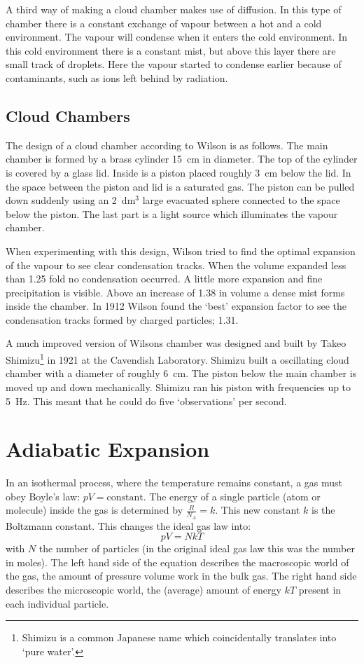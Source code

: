 \documentclass[12pt,a4paper]{article}
\numberwithin{equation}{section}
\numberwithin{figure}{section}
\numberwithin{table}{section}
\begin{document}
A third way of making a cloud chamber makes use of diffusion. In this type of chamber there is a constant exchange of vapour between a hot and a cold environment. The vapour will condense when it enters the cold environment. In this cold environment there is a constant mist, but above this layer there are small track of droplets. Here the vapour started to condense earlier because of contaminants, such as ions left behind by radiation.

\subsection{Cloud Chambers}
The design of a cloud chamber according to Wilson is as follows. The main chamber is formed by a brass cylinder 15~cm in diameter. The top of the cylinder is covered by a glass lid. Inside is a piston placed roughly 3~cm below the lid. In the space between the piston and lid is a saturated gas. The piston can be pulled down suddenly using an 2~dm$^3$ large evacuated sphere connected to the space below the piston. The last part is a light source which illuminates the vapour chamber.

When experimenting with this design, Wilson tried to find the optimal expansion of the vapour to see clear condensation tracks. When the volume expanded less than 1.25 fold no condensation occurred. A little more expansion and fine precipitation is visible. Above an increase of 1.38 in volume a dense mist forms inside the chamber. In 1912 Wilson found the `best' expansion factor to see the condensation tracks formed by charged particles; 1.31.

A much improved version of Wilsons chamber was designed and built by Takeo Shimizu\footnote{Shimizu is a common Japanese name which coincidentally translates into `pure water'.} in 1921 at the Cavendish Laboratory. Shimizu built a oscillating cloud chamber with a diameter of roughly 6~cm. The piston below the main chamber is moved up and down mechanically. Shimizu ran his piston with frequencies up to 5~Hz. This meant that he could do five `observations' per second.

\section{Adiabatic Expansion}
In an isothermal process, where the temperature remains constant, a gas must obey Boyle's law: $pV=\mbox{constant}$. The energy of a single particle (atom or molecule) inside the gas is determined by $\frac{R}{N_A}=k$. This new constant $k$ is the Boltzmann constant. This changes the ideal gas law into:
\begin{equation}
pV=NkT
\end{equation}
with $N$ the number of particles (in the original ideal gas law this was the number in moles). The left hand side of the equation describes the macroscopic world of the gas, the amount of pressure volume work in the bulk gas. The right hand side describes the microscopic world, the (average) amount of energy $kT$ present in each individual particle.
\end{document}
